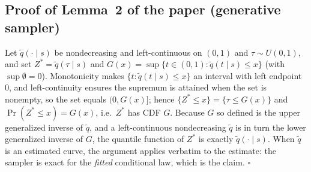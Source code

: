 \documentclass[11pt]{article}
\begin{document}
\subsection*{Proof of Lemma~2 of the paper (generative sampler)}
Let $\widetilde{q}(\cdot \mid s)$ be nondecreasing and left-continuous
on $(0,1)$ and $\tau \sim U(0,1)$, and set
$Z^*=\widetilde q(\tau\mid s)$ and
$G(x)=\sup\{t\in(0,1):\widetilde q(t\mid s)\le x\}$ (with
$\sup\emptyset=0$). Monotonicity makes
$\{t:\widetilde q(t\mid s)\le x\}$ an interval with left endpoint $0$,
and left-continuity ensures the supremum is attained when the set is
nonempty, so the set equals $(0,G(x)]$; hence
$\{Z^*\le x\}=\{\tau\le G(x)\}$ and
$\Pr(Z^*\le x)=G(x)$, i.e.\ $Z^*$ has CDF $G$. Because $G$ so defined
is the upper generalized inverse of $\widetilde q$, and a
left-continuous nondecreasing $\widetilde q$ is in turn the lower
generalized inverse of $G$, the quantile function of $Z^*$ is exactly
$\widetilde q(\cdot\mid s)$. When $\widetilde q$ is an estimated curve,
the argument applies verbatim to the estimate: the sampler is exact for
the \emph{fitted} conditional law, which is the claim. $\square$
\end{document}
